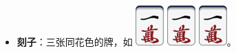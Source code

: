 \documentclass[
	lang=cn,
	color=green
]{elegantbook}
\begin{document}
\begin{remark}
    \begin{itemize}
        \item \textbf{刻子}：三张同花色的牌，如 \includegraphics[scale=0.5]{images/mahjong/1m.png} \includegraphics[scale=0.5]{images/mahjong/1m.png} \includegraphics[scale=0.5]{images/mahjong/1m.png}。

\end{itemize}
\end{remark}
\end{document}
